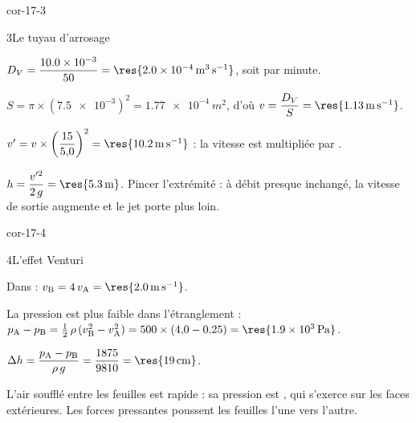 \begin{blocLivre}{cor-17-3}
\begin{corrige}{3}{Le tuyau d'arrosage}
\begin{questions}
\item $D_V=\dfrac{\num{10.0e-3}}{50}=\res{\qty{2,0e-4}{m^3.s^{-1}}}$, soit  par minute.
\item $S=\pi\times(\num{7.5e-3})^2=\qty{1,77e-4}{m^2}$, d'où $v=\dfrac{D_V}{S}=\res{\qty{1,13}{m.s^{-1}}}$.
\item $v'=v\times\left(\dfrac{15}{5{,}0}\right)^2=\res{\qty{10,2}{m.s^{-1}}}$ : la vitesse est multipliée par .
\item $h=\dfrac{v'^2}{2\,g}=\res{\qty{5,3}{m}}$. Pincer l'extrémité  : à débit presque inchangé, la
vitesse de sortie augmente et le jet porte plus loin.
\end{questions}
\end{corrige}
\end{blocLivre}
\begin{blocLivre}{cor-17-4}
\begin{corrige}{4}{L'effet Venturi}
\begin{questions}
\item Dans  : $v_\mathrm{B}=4\,v_\mathrm{A}=\res{\qty{2,0}{m.s^{-1}}}$.
\item La pression est plus faible dans l'étranglement :
$p_\mathrm{A}-p_\mathrm{B}=\frac12\,\rho\,(v_\mathrm{B}^2-v_\mathrm{A}^2)=500\times(4{,}0-0{,}25)=\res{\qty{1,9e3}{Pa}}$.
\item $\Delta h=\dfrac{p_\mathrm{A}-p_\mathrm{B}}{\rho\,g}=\dfrac{1875}{9810}=\res{\qty{19}{cm}}$.
\item L'air soufflé entre les feuilles est rapide : sa pression est , qui
s'exerce sur les faces extérieures. Les forces pressantes poussent les feuilles l'une vers l'autre.
\end{questions}
\end{corrige}
\end{blocLivre}
